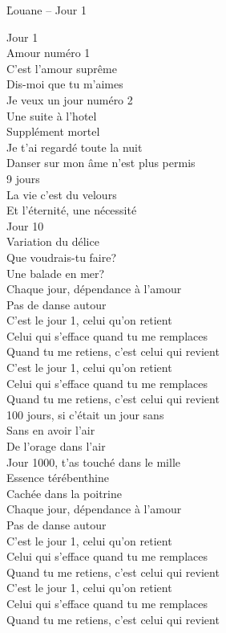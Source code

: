 \documentclass{novel}
\begin{document}
\newpage
\normalsize
\h*{Louane – Jour 1}
\begin{multicols}{2}
Jour 1 \\
Amour numéro 1 \\
C'est l'amour suprême \\
Dis-moi que tu m'aimes \\
Je veux un jour numéro 2 \\
Une suite à l'hotel \\
Supplément mortel \\
Je t'ai regardé toute la nuit \\
Danser sur mon âme n'est plus permis \\
9 jours \\
La vie c'est du velours \\
Et l'éternité, une nécessité \\
Jour 10 \\
Variation du délice \\
Que voudrais-tu faire? \\
Une balade en mer? \\
Chaque jour, dépendance à l'amour \\
Pas de danse autour \\

C'est le jour 1, celui qu'on retient \\
Celui qui s'efface quand tu me remplaces \\
Quand tu me retiens, c'est celui qui revient \\
C'est le jour 1, celui qu'on retient \\
Celui qui s'efface quand tu me remplaces \\
Quand tu me retiens, c'est celui qui revient \\

100 jours, si c'était un jour sans \\
Sans en avoir l'air \\
De l'orage dans l'air \\
Jour 1000, t'as touché dans le mille \\
Essence térébenthine \\
Cachée dans la poitrine \\
Chaque jour, dépendance à l'amour \\
Pas de danse autour \\

C'est le jour 1, celui qu'on retient \\
Celui qui s'efface quand tu me remplaces \\
Quand tu me retiens, c'est celui qui revient \\
C'est le jour 1, celui qu'on retient \\
Celui qui s'efface quand tu me remplaces \\
Quand tu me retiens, c'est celui qui revient \\


\end{multicols}
\end{document}
